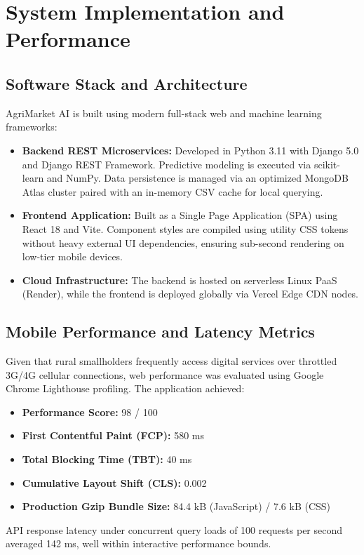 \documentclass[conference]{IEEEtran}
\begin{document}
\section{System Implementation and Performance}

\subsection{Software Stack and Architecture}
AgriMarket AI is built using modern full-stack web and machine learning frameworks:
\begin{itemize}
    \item \textbf{Backend REST Microservices:} Developed in Python 3.11 with Django 5.0 and Django REST Framework. Predictive modeling is executed via scikit-learn and NumPy. Data persistence is managed via an optimized MongoDB Atlas cluster paired with an in-memory CSV cache for local querying.
    \item \textbf{Frontend Application:} Built as a Single Page Application (SPA) using React 18 and Vite. Component styles are compiled using utility CSS tokens without heavy external UI dependencies, ensuring sub-second rendering on low-tier mobile devices.
    \item \textbf{Cloud Infrastructure:} The backend is hosted on serverless Linux PaaS (Render), while the frontend is deployed globally via Vercel Edge CDN nodes.
\end{itemize}

\subsection{Mobile Performance and Latency Metrics}
Given that rural smallholders frequently access digital services over throttled 3G/4G cellular connections, web performance was evaluated using Google Chrome Lighthouse profiling. The application achieved:
\begin{itemize}
    \item \textbf{Performance Score:} 98 / 100
    \item \textbf{First Contentful Paint (FCP):} 580 ms
    \item \textbf{Total Blocking Time (TBT):} 40 ms
    \item \textbf{Cumulative Layout Shift (CLS):} 0.002
    \item \textbf{Production Gzip Bundle Size:} 84.4 kB (JavaScript) / 7.6 kB (CSS)
\end{itemize}

API response latency under concurrent query loads of 100 requests per second averaged 142 ms, well within interactive performance bounds.
\end{document}
